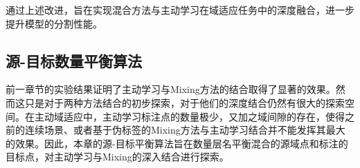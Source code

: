     通过上述改进，旨在实现混合方法与主动学习在域适应任务中的深度融合，进一步提升模型的分割性能。 
    

    \subsection{源-目标数量平衡算法}

    前一章节的实验结果证明了主动学习与Mixing方法的结合取得了显著的效果。然而这只是对于两种方法结合的初步探索，对于他们的深度结合仍然有很大的探索空间。在主动域适应中，主动学习标注点的数量极少，又加之域间隙的存在，使得之前的连续场景、或者基于伪标签的Mixing方法与主动学习结合并不能发挥其最大的效果。因此，本章的源-目标平衡算法旨在数量层名平衡混合的源域点和标注的目标点，对主动学习与Mixing的深入结合进行探索。
    
